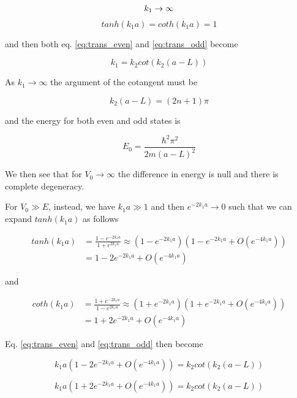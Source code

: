 \documentclass{article}
\begin{document}
\[
k_1 \rightarrow \infty \\
\]
\[
tanh(k_1a) = coth(k_1a) = 1
\]

and then both eq. \eqref{eq:trans_even} and \eqref{eq:trans_odd} become

\begin{equation}
k_1 = k_2 cot(k_2(a-L))
\end{equation}

As \(k_1 \rightarrow \infty\) the argument of the cotangent must be

\begin{equation}
\label{eq:k2_v0big}
k_2(a-L) = (2n+1)\pi
\end{equation}

and the energy for both even and odd states is

\begin{equation}
E_0 = \frac{\hbar^2 \pi^2}{2m(a-L)^2}
\end{equation}

We then see that for \( V_0 \rightarrow \infty \) the difference in energy is null and there is complete degeneracy.

For \(V_0 \gg E \), instead, we have \(k_1a \gg 1\) and then \(e^{-2k_1a} \rightarrow 0\) such that we can expand \(tanh(k_1a)\) as follows

\begin{align}
tanh(k_1a) & = \frac{1-e^{-2k_1a}}{1+e^{2k_1a}} \approx \left(1-e^{-2k_1a}\right) \left(1-e^{-2k_1a} + O\left(e^{-4k_1a}\right) \right) \nonumber \\
& = 1-2e^{-2k_1a} + O\left(e^{-4k_1a}\right)
\end{align}

and 

\begin{align}
coth(k_1a) & = \frac{1+e^{-2k_1a}}{1-e^{2k_1a}} \approx \left(1+e^{-2k_1a}\right) \left(1+e^{-2k_1a} + O\left(e^{-4k_1a}\right) \right) \nonumber \\
& = 1+2e^{-2k_1a} + O\left(e^{-4k_1a}\right)
\end{align}

Eq. \eqref{eq:trans_even} and \eqref{eq:trans_odd} then become

\begin{equation}
\label{eq:trans_approx_left_even}
k_1a \left( 1-2e^{-2k_1a} + O\left(e^{-4k_1a}\right) \right) = k_2cot(k_2(a-L))
\end{equation}

\begin{equation}
\label{eq:trans_approx_left_odd}
k_1a \left( 1+2e^{-2k_1a} + O\left(e^{-4k_1a}\right) \right) = k_2cot(k_2(a-L))
\end{equation}
\end{document}
